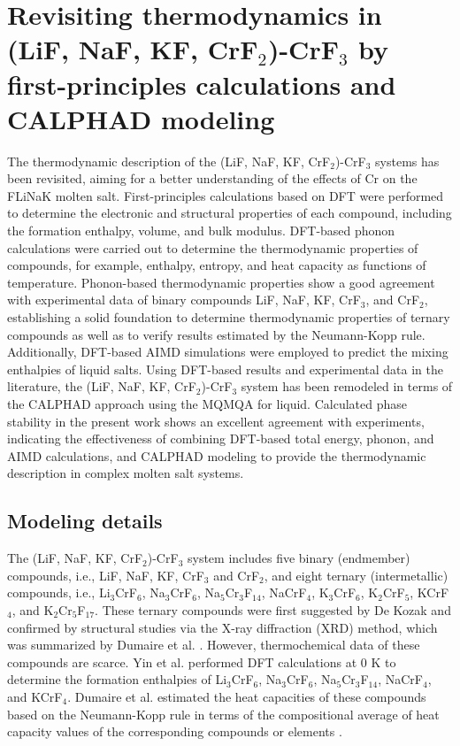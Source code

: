 \section{Revisiting thermodynamics in (LiF, NaF, KF, CrF${_2}$)-CrF${_3}$ by first-principles calculations and CALPHAD modeling} \label{moltensalts:sec:FLiNaKCr}
The thermodynamic description of the (LiF, NaF, KF, CrF$_2$)-CrF$_3$ systems has been revisited, aiming for a better understanding of the effects of Cr on the FLiNaK molten salt. First-principles calculations based on DFT were performed to determine the electronic and structural properties of each compound, including the formation enthalpy, volume, and bulk modulus. DFT-based phonon calculations were carried out to determine the thermodynamic properties of compounds, for example, enthalpy, entropy, and heat capacity as functions of temperature. Phonon-based thermodynamic properties show a good agreement with experimental data of binary compounds LiF, NaF, KF, CrF$_3$, and CrF$_2$, establishing a solid foundation to determine thermodynamic properties of ternary compounds as well as to verify results estimated by the Neumann-Kopp rule. Additionally, DFT-based AIMD simulations were employed to predict the mixing enthalpies of liquid salts. Using DFT-based results and experimental data in the literature, the (LiF, NaF, KF, CrF$_2$)-CrF$_3$ system has been remodeled in terms of the CALPHAD approach using the MQMQA for liquid. Calculated phase stability in the present work shows an excellent agreement with experiments, indicating the effectiveness of combining DFT-based total energy, phonon, and AIMD calculations, and CALPHAD modeling to provide the thermodynamic description in complex molten salt systems.

\subsection{Modeling details} \label{moltensalts:ssec:FLiNaKCrmodel}
The (LiF, NaF, KF, CrF$_2$)-CrF$_3$ system includes five binary (endmember) compounds, i.e., LiF, NaF, KF, CrF$_3$ and CrF$_2$, and eight ternary (intermetallic) compounds, i.e., Li$_3$CrF$_6$, Na$_3$CrF$_6$, Na$_5$Cr$_3$F$_{14}$, NaCrF$_4$, K$_3$CrF$_6$, K$_2$CrF$_5$, KCrF$_4$, and K$_2$Cr$_5$F$_{17}$. These ternary compounds were first suggested by De Kozak \cite{DeKozak1969} and confirmed by structural studies \cite{de1975systeme,miranday1975croissance, sturm1962phase, garcia2014electrostatic, brunton1969crystal, le2003distorted, manaka2011effects, sassoye2006crystal} via the X-ray diffraction (XRD) method, which was summarized by Dumaire et al. \cite{dumaire2021thermodynamic}. However, thermochemical data of these compounds are scarce. Yin et al. \cite{yin2018thermodynamic, yin2015thermodynamic, yin2014thermodynamic} performed DFT calculations at 0 K to determine the formation enthalpies of Li$_3$CrF$_6$, Na$_3$CrF$_6$, Na$_5$Cr$_3$F$_{14}$, NaCrF$_4$, and KCrF$_4$. Dumaire et al. \cite{dumaire2021thermodynamic} estimated the heat capacities of these compounds based on the Neumann-Kopp rule in terms of the compositional average of heat capacity values of the corresponding compounds or elements \cite{leitner2010application}. 

